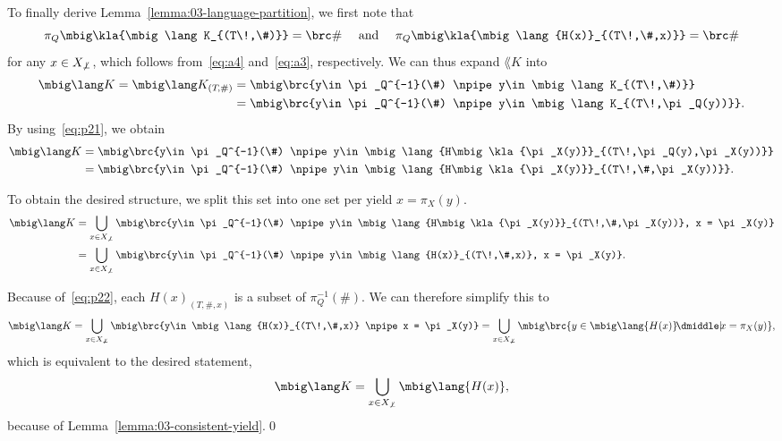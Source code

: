 To finally derive Lemma~\ref{lemma:03-language-partition}, we first note that
\begin{equation}\label{eq:p22}
 \pi_Q\mbig\kla{\mbig\lang K_{(T\!,\#)}} = \brc\#
 \quad\text{ and }\quad
 \pi_Q\mbig\kla{\mbig\lang{H(x)}_{(T\!,\#,x)}} = \brc\#
\end{equation}
for any $x\in X_{\not\bot}$, which follows from~\eqref{eq:a4} and~\eqref{eq:a3}, respectively.
We can thus expand $\lang K$ into
\begin{align*}
 \mbig\lang K
 = \mbig\lang K_{(T\!,\#)}
 &= \mbig\brc{y\in \pi_Q^{-1}(\#) \npipe y\in\mbig\lang K_{(T\!,\#)}} \\
 &= \mbig\brc{y\in \pi_Q^{-1}(\#) \npipe y\in\mbig\lang K_{(T\!,\pi_Q(y))}}.
\end{align*}
By using~\eqref{eq:p21}, we obtain
\begin{align*}
 \mbig\lang K
 &= \mbig\brc{y\in \pi_Q^{-1}(\#) \npipe y\in\mbig\lang{H\mbig\kla{\pi_X(y)}}_{(T\!,\pi_Q(y),\pi_X(y))}} \\
 &= \mbig\brc{y\in \pi_Q^{-1}(\#) \npipe y\in\mbig\lang{H\mbig\kla{\pi_X(y)}}_{(T\!,\#,\pi_X(y))}}.
\end{align*}

To obtain the desired structure, we split this set into one set per yield $x = \pi_X(y)$.
\begin{align*}
 \mbig\lang K
 &= \bigcup_{x\in X_{\not\bot}} \mbig\brc{y\in \pi_Q^{-1}(\#) \npipe y\in\mbig\lang{H\mbig\kla{\pi_X(y)}}_{(T\!,\#,\pi_X(y))}, x = \pi_X(y)} \\
 &= \bigcup_{x\in X_{\not\bot}} \mbig\brc{y\in \pi_Q^{-1}(\#) \npipe y\in\mbig\lang{H(x)}_{(T\!,\#,x)}, x = \pi_X(y)}.
\end{align*}

Because of~\eqref{eq:p22}, each $H(x)_{(T,\#,x)}$ is a subset of $\pi_Q^{-1}(\#)$. We can therefore simplify this to
\[
 \mbig\lang K
 = \bigcup_{x\in X_{\not\bot}} \mbig\brc{y\in \mbig\lang{H(x)}_{(T\!,\#,x)} \npipe x = \pi_X(y)}
 = \bigcup_{x\in X_{\not\bot}} \mbig\brc{y\in \mbig\lang{H(x)} \npipe x = \pi_X(y)},
\]
which is equivalent to the desired statement,
\[
 \mbig\lang K = \bigcup_{x\in X_{\not\bot}} \mbig\lang{H(x)},
\]
because of Lemma~\ref{lemma:03-consistent-yield}.\qed
